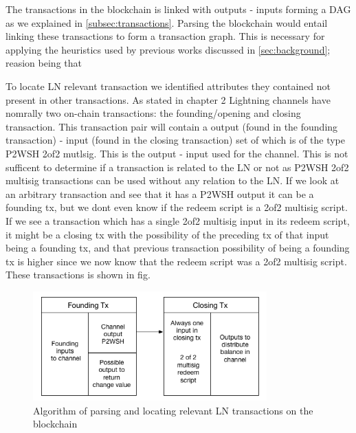 The transactions in the blockchain is linked with outputs - inputs forming a DAG as we explained in \cref{subsec:transactions}. Parsing the blockchain would entail linking these transactions to form a transaction graph. This is necessary for applying the heuristics used by previous works discussed in \cref{sec:background}; reasion being that 


To locate LN relevant transaction we identified attributes they contained not present in other transactions. As stated in chapter 2  Lightning channels have nomrally two on-chain transactions: the founding/opening and closing transaction. This transaction pair will contain a output (found in the founding transaction) - input (found in the closing transaction) set of which is of the type P2WSH 2of2 mutlsig. This is the output - input used for the channel. This is not sufficent to determine if a transaction is related to the LN or not as P2WSH 2of2 multisig transactions can be used without any relation to the LN. If we look at an arbitrary transaction and see that it has a P2WSH output it can be a founding tx, but we dont even know if the redeem script is a 2of2 multisig script. If we see a transaction which has a single 2of2 multisig input in its redeem script, it might be a closing tx with the possibility of the preceding tx of that input being a founding tx, and that previous transaction possibility of being a founding tx is higher since we now know that the redeem script was a 2of2 multisig script.  These transactions is shown in fig.

\begin{figure}[h]
    \centering
    \includegraphics[width=9cm]{figures/lnchain.png}
    \caption{Algorithm of parsing and locating relevant LN transactions on the blockchain}
    \label{fig:htlc_bc}
\end{figure}


